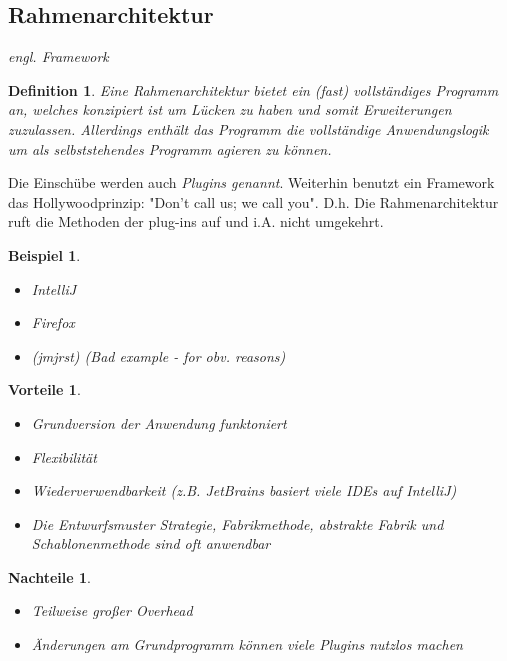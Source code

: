 \documentclass[a4paper]{article}
\theoremstyle{break}
\newtheorem{defi}{Definition}[section]
\newtheorem{ex}{Beispiel}[section]
\newtheorem{why}{Vorteile}[section]
\newtheorem{whynot}{Nachteile}[section]
\begin{document}
\subsection{Rahmenarchitektur}
\textit{engl. Framework}
\begin{defi}
	Eine Rahmenarchitektur bietet ein (fast) vollständiges Programm an, welches konzipiert ist um Lücken zu haben und somit Erweiterungen zuzulassen. Allerdings enthält das Programm die vollständige Anwendungslogik um als selbststehendes Programm agieren zu können.
\end{defi}
Die Einschübe werden auch \textit{Plugins genannt}. Weiterhin benutzt ein Framework das Hollywoodprinzip: "Don't call us; we call you". D.h. Die Rahmenarchitektur ruft die Methoden der plug-ins auf und i.A. nicht umgekehrt.
\begin{ex}
	\begin{itemize}
		\item IntelliJ
		\item Firefox
		\item (jmjrst) \textit{(Bad example - for obv. reasons)}
	\end{itemize}
\end{ex}
\begin{why}
	\begin{itemize}
		\item Grundversion der Anwendung funktoniert
		\item Flexibilität
		\item Wiederverwendbarkeit (z.B. JetBrains basiert viele IDEs auf IntelliJ)
		\item Die Entwurfsmuster Strategie, Fabrikmethode, abstrakte Fabrik und Schablonenmethode sind oft anwendbar
	\end{itemize}
\end{why}
\begin{whynot}
	\begin{itemize}
		\item Teilweise großer Overhead
		\item Änderungen am Grundprogramm können viele Plugins nutzlos machen
	\end{itemize}
\end{whynot}
\end{document}

